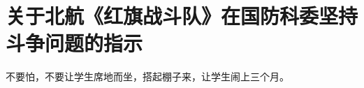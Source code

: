 \section[关于北航《红旗战斗队》在国防科委坚持斗争问题的指示（一九六六年八月）]{关于北航《红旗战斗队》在国防科委坚持斗争问题的指示}


不要怕，不要让学生席地而坐，搭起棚子来，让学生闹上三个月。



